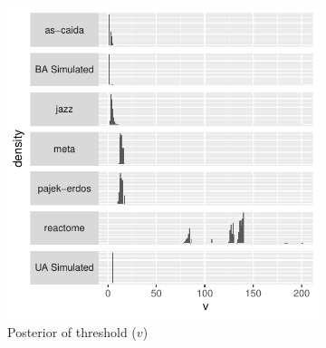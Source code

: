 \documentclass[
  10pt,
  a4paper,
]{scrreprt}
\theoremstyle{plain}
\theoremstyle{definition}
\theoremstyle{plain}
\theoremstyle{remark}
\begin{document}
{\begin{figure}
\begin{minipage}[t]{0.50\linewidth}
{\begin{figure}[H]

{\centering \includegraphics[width=1\textwidth,height=\textheight]{doc_files/figure-pdf/fig-thresh-1.pdf}

}

\caption{\label{fig-thresh}Posterior of threshold (\(v\))}

\end{figure}

}

\end{minipage}%
%
\begin{minipage}[t]{0.50\linewidth}

{\centering 

\begin{figure}[H]


\end{figure}}
\end{minipage}
\end{figure}}
\end{document}
